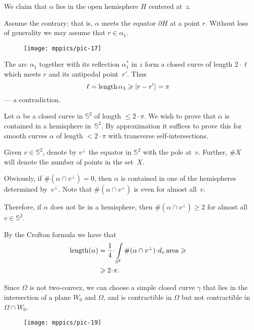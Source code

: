 We claim that $\alpha$ lies in the open hemisphere $H$ centered at~$z$.  

Assume the contrary; that is, $\alpha$ meets the equator $\partial H$ at a point $r$.
Without loss of generality we may assume that $r\in\alpha_1$.

\begin{wrapfigure}{r}{30 mm}
\vskip-4mm
\centering
\texttt{[image: mppics/pic-17]}
\end{wrapfigure}

The arc $\alpha_1$ together with its reflection $\alpha_1^*$ in $z$ form a closed curve of length $2\cdot \ell$ which meets $r$ and its antipodal point~$r'$.
Thus 
\[\ell\z=\length \alpha_1\ge \dist{r}{r'}{}=\pi\] 
--- a contradiction.

Let $\alpha$ be a closed curve in  $\mathbb{S}^2$ of length $\le 2\cdot\pi$.  We wish to prove that $\alpha$ is contained in a hemisphere in~$\mathbb{S}^2$.
By approximation it suffices to prove this for  smooth curves $\alpha$ of length $< 2\cdot\pi$ with transverse self-intersections. 

Given $v\in \mathbb{S}^2$, denote by $v^\perp$ the equator in $\mathbb{S}^2$ with the pole at~$v$.
Further, $\# X$ will denote the number of points in the set~$X$.

Obviously,  if $\#(\alpha\cap v^\perp) =0$, then $\alpha$ is contained in one of the hemispheres determined by~$v^\perp$. 
Note that $\#(\alpha\cap v^\perp)$ is even for almost all~$v$.

Therefore, if $\alpha$ does not lie in a hemisphere, then
$\#(\alpha\cap v^\perp) \ge 2$ for almost all $v\in\mathbb{S}^2$.  

By the Crofton formula we have that
\begin{align*}
\length(\alpha)
&=\frac 1 4\cdot \int\limits_{\mathbb{S}^2}\#(\alpha\cap v^\perp)\cdot d_v\area\ge
\\
&\ge2\cdot\pi.
\end{align*}

Since  $\Omega$ is not two-convex, 
we can choose a simple closed curve $\gamma$ that lies in the intersection of a plane $W_0$ and $\Omega$, 
and is contractible in $\Omega$ but not contractible in $\Omega\cap W_0$.

\begin{wrapfigure}{r}{45 mm}
\vskip-4mm
\centering
\texttt{[image: mppics/pic-19]}
\end{wrapfigure}

